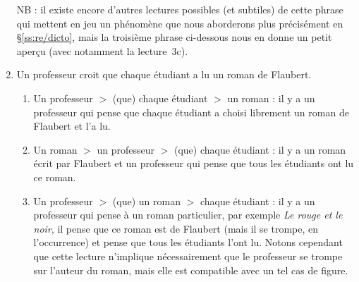 \begin{exo}
\begin{solu}
\begin{enumerate}
\begin{enumerate}
\end{enumerate}

NB : il existe encore d'autres lectures possibles (et subtiles) de cette phrase qui mettent en jeu un phénomène que nous aborderons plus précisément en \S\ref{ss:re/dicto}, mais la troisième phrase ci-dessous nous en donne un petit aperçu (avec notamment la lecture~3c).

\item 
Un professeur croit que chaque étudiant a lu un roman de Flaubert.

\begin{enumerate}
\item Un professeur $>$ (que) chaque étudiant $>$ un roman :
il y a un professeur qui pense que chaque étudiant a choisi librement un roman de Flaubert et l'a lu.

\item Un roman $>$ un professeur $>$ (que) chaque étudiant :
il y a un roman écrit par Flaubert et un professeur qui pense que tous les étudiants ont lu ce roman.

\item Un professeur $>$ (que) un roman $>$ chaque étudiant :
il y a un professeur qui pense à un roman particulier, par exemple \emph{Le rouge et le noir}, il pense que ce roman est de Flaubert (mais il se trompe, en l'occurrence) et pense que tous les étudiants l'ont lu.
Notons cependant que cette lecture n'implique nécessairement que le professeur se trompe sur l'auteur du roman, mais elle est compatible avec un tel cas de figure.

\end{enumerate}

\end{enumerate}
\end{solu}
\end{exo}
